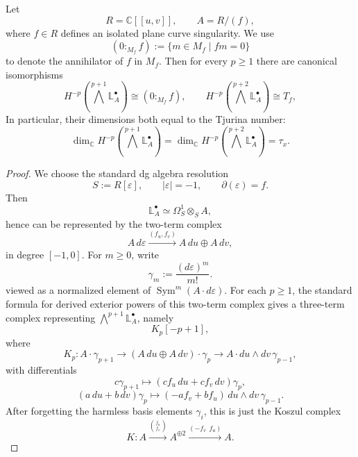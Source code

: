\documentclass[12pt,reqno]{amsart}
\begin{document}
\begin{lemma}\label{lem:tail-map-quotient}
Let
\[
  R=\mathbb C[[u,v]],\qquad A=R/(f),
\]
where $f\in R$ defines an isolated plane curve singularity. We use
\[
  (0:_{M_f}f):=\{m\in M_f\mid fm=0\}
\]
to denote the annihilator of \(f\) in \(M_f\). Then for every $p\ge 1$ there are canonical isomorphisms
\[
H^{-p}\!\left(\bigwedge^{p+1}\mathbb{L}^{\bullet}_A\right)\cong (0:_{M_f}f),
\qquad
H^{-p}\!\left(\bigwedge^{p+2}\mathbb{L}^{\bullet}_A\right)\cong T_f,
\]
In particular, their dimensions both equal to the Tjurina number:
\[
  \dim_{\mathbb C}H^{-p}\!\left(\bigwedge^{p+1}\mathbb{L}^{\bullet}_A\right)
  =
  \dim_{\mathbb C}H^{-p}\!\left(\bigwedge^{p+2}\mathbb{L}^{\bullet}_A\right)
  =
  \tau_x.
\]
\end{lemma}
  
\begin{proof}
We choose the standard dg algebra resolution 
\[
S:=R[\varepsilon],\qquad |\varepsilon|=-1,\qquad \partial(\varepsilon)=f.
\]
Then
\[
\mathbb{L}^{\bullet}_A\simeq \Omega^1_{S}\otimes_S A,
\]
hence can be represented by the two-term complex
\[
A\, d\varepsilon
\xrightarrow{(f_u,f_v)}
A\,du\oplus A\,dv,
\]
in degree \([-1,0]\). For \(m\ge 0\), write
\[
\gamma_m:=\frac{(d\varepsilon)^m}{m!}.
\]
viewed as a normalized element of \(\operatorname{Sym}^m(A\cdot d\varepsilon)\). For each $p\ge 1$, the standard formula for derived exterior powers of this two-term complex gives a three-term complex representing \(\bigwedge^{p+1}\mathbb{L}^{\bullet}_A\), namely
\[
K_p[-p+1],
\]
where
\[
  K_p:
  A\cdot \gamma_{p+1}
  \longrightarrow
  (A\,du\oplus A\,dv)\cdot \gamma_p
  \longrightarrow
  A\cdot du\wedge dv\,\gamma_{p-1},
  \]
  with differentials
  \[
  c\gamma_{p+1}\longmapsto
  (cf_u\,du+cf_v\,dv)\gamma_p,
  \]
  \[
  (a\,du+b\,dv)\gamma_p
  \longmapsto
  (-af_v+bf_u)\,du\wedge dv\,\gamma_{p-1}.
  \]
  After forgetting the harmless basis elements $\gamma_i$, this is just the Koszul complex
\[
K:
A \xrightarrow{\binom{f_u}{f_v}} A^{\oplus 2}\xrightarrow{(-f_v\ \ f_u)} A.
\]


\end{proof}
\end{document}
